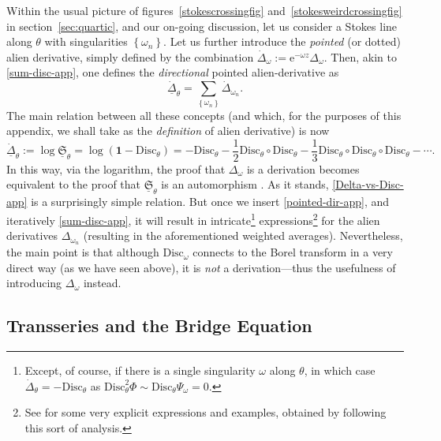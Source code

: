\documentclass[11pt,a4paper]{article}
\newcommand{\be}{\begin{equation}}
\newcommand{\ee}{\end{equation}}
\def\1{\mathbf{1}}
\def\disc{{\mathrm{Disc}}}
\newcommand{\rme}{{\mathrm{e}}}
\begin{document}
Within the usual picture of figures~\ref{stokescrossingfig} and~\ref{stokesweirdcrossingfig} in section~\ref{sec:quartic}, and our on-going discussion, let us consider a Stokes line along $\theta$ with singularities $\left\{ \omega_n \right\}$. Let us further introduce the \textit{pointed} (or dotted) alien derivative, simply defined by the combination $\dot{\Delta}_\omega := \rme^{-\omega z} \Delta_\omega$. Then, akin to \eqref{sum-disc-app}, one defines the \textit{directional} pointed alien-derivative as
%
\be
\label{pointed-dir-app}
\dot{\underline{\Delta}}_\theta = \sum_{\left\{ \omega_n \right\}} \dot{\Delta}_{\omega_n}.
\ee
%
\noindent
The main relation between all these concepts (and which, for the purposes of this appendix, we shall take as the \textit{definition} of alien derivative) is now \cite{e81}
%
\be
\label{Delta-vs-Disc-app}
\dot{\underline{\Delta}}_\theta := \log \underline{\mathfrak{S}}_\theta = \log \left( \1 - \disc_\theta \right) = - \disc_\theta - \frac{1}{2} \disc_\theta \circ \disc_\theta - \frac{1}{3} \disc_\theta \circ \disc_\theta \circ \disc_\theta - \cdots.
\ee
%
\noindent
In this way, via the logarithm, the proof that $\Delta_{\omega}$ is a derivation becomes equivalent to the proof that $\underline{\mathfrak{S}}_\theta$ is an automorphism  \cite{e81}. As it stands, \eqref{Delta-vs-Disc-app} is a surprisingly simple relation. But once we insert \eqref{pointed-dir-app}, and iteratively \eqref{sum-disc-app}, it will result in intricate\footnote{Except, of course, if there is a single singularity $\omega$ along $\theta$, in which case $\dot{\Delta}_\theta = 
- \disc_\theta$ as $\disc_\theta^2 \Phi \sim \disc_\theta \Psi_\omega = 0$.} expressions\footnote{See \cite{s07} for some very explicit expressions and examples, obtained by following this sort of analysis.} for the alien derivatives $\Delta_{\omega_n}$ (resulting in the aforementioned weighted averages). Nevertheless, the main point is that although $\disc_\omega$ connects to the Borel transform in a very direct way (as we have seen above), it is \textit{not} a derivation---thus the usefulness of introducing $\Delta_\omega$ instead.

\subsection*{Transseries and the Bridge Equation}
\end{document}
